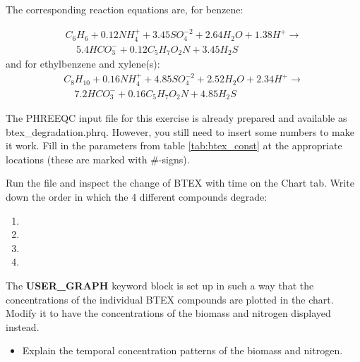 The corresponding reaction equations are, for benzene:

\begin{eqnarray}
C_6H_6 + 0.12NH_4^+ + 3.45 SO_4^{-2} + 2.64H_2O + 1.38H^+ \rightarrow \nonumber \\
 \ \  \  \  \ 5.4HCO_3^- + 0.12 C_5H_7O_2N + 3.45 H_2S
\end{eqnarray}
and for ethylbenzene and xylene(s):
\begin{eqnarray}
C_8H_10 + 0.16NH_4^+ + 4.85 SO_4^{-2} + 2.52H_2O + 2.34H^+ \rightarrow \nonumber \\
 \ \  \  \  \ 7.2HCO_3^- + 0.16 C_5H_7O_2N + 4.85 H_2S
\end{eqnarray}

The PHREEQC input file for this exercise is already prepared and available as {\color{red} btex\_degradation.phrq}. However, you still need to insert some numbers to make it work. Fill in the parameters from table \ref{tab:btex_const} at the appropriate locations (these are marked with \#-signs).

Run the file and inspect the change of BTEX with time on the Chart tab. Write down the order in which the 4 different compounds degrade:

\begin{enumerate}

\item 

\item

\item

\item

\end{enumerate}

The \textbf{USER\_GRAPH} keyword block is set up in such a way that the concentrations of the individual BTEX compounds are plotted in the chart. Modify it to have the concentrations of the biomass and nitrogen displayed instead.

\begin{itemize}

\item Explain the temporal concentration patterns of the biomass and nitrogen.

\end{itemize}